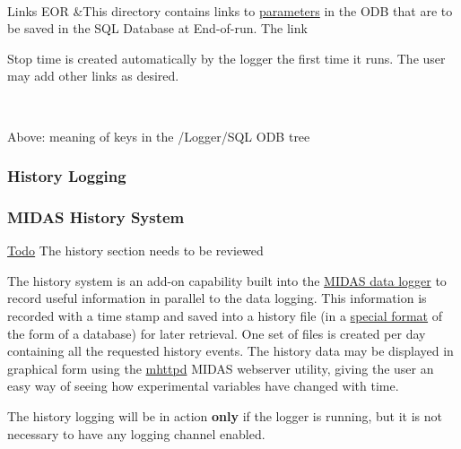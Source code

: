 \begin{table}[h]
\begin{TabularC}{2}
\\
\label{F_mySQL_F_Logger_Links_EOR}
\hypertarget{F_mySQL_F_Logger_Links_EOR}{}
 Links EOR  &This directory contains links to \hyperlink{structparameters}{parameters} in the ODB that are to be saved in the SQL Database at End-\/of-\/run. The link
\begin{DoxyItemize}
\item Stop time is created automatically by the logger the first time it runs. The user may add other links as desired.   
\end{DoxyItemize}\\
\end{TabularC}
\centering
\caption{Above: meaning of keys in the /Logger/SQL ODB tree }
\end{table}
\par
 

\label{index_end}
\hypertarget{index_end}{}
 \subsubsection{History Logging}\label{F_History_logging}
\par
 \label{F_History_logging_idx_Logging_History}
\hypertarget{F_History_logging_idx_Logging_History}{}
 \label{F_History_logging_idx_History_Logging}
\hypertarget{F_History_logging_idx_History_Logging}{}
 

\par
 \label{F_History_logging_idx_history_system}
\hypertarget{F_History_logging_idx_history_system}{}
\hypertarget{F_History_logging_F_History_System}{}\subsubsection{MIDAS History System}\label{F_History_logging_F_History_System}
\begin{Desc}
\item[\hyperlink{todo__todo000007}{Todo}]The history section needs to be reviewed\end{Desc}
The history system is an add-\/on capability built into the \hyperlink{F_Logging_F_mlogger_utility}{MIDAS data logger} to record useful information in parallel to the data logging. This information is recorded with a time stamp and saved into a history file (in a \hyperlink{F_History_logging_F_History_format}{special format} of the form of a database) for later retrieval. One set of files is created per day containing all the requested history events. The history data may be displayed in graphical form using the \hyperlink{RC_mhttpd_utility}{mhttpd} MIDAS webserver utility, giving the user an easy way of seeing how experimental variables have changed with time. \par
 The history logging will be in action {\bfseries only} if the logger is running, but it is not necessary to have any logging channel enabled.

